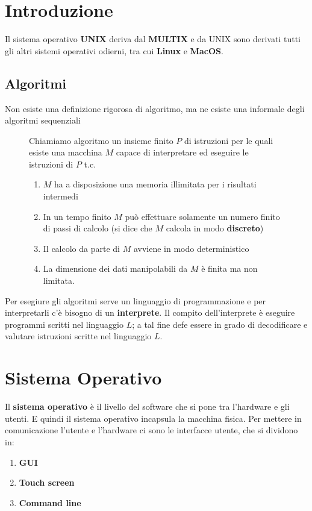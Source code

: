 \documentclass[a4paper]{article}
\theoremstyle{break}
\theoremstyle{break}
\theoremstyle{break}
\theoremstyle{break}
\begin{document}


\tableofcontents
\pagebreak

\section{Introduzione}
Il sistema operativo \textbf{UNIX} deriva dal \textbf{MULTIX} e da UNIX sono
derivati tutti gli altri sistemi operativi odierni, tra cui \textbf{Linux} e
\textbf{MacOS}.

\subsection{Algoritmi}
Non esiste una definizione rigorosa di algoritmo, ma ne esiste una informale degli
algoritmi sequenziali
\begin{figure}[H]
  \begin{definition}
    Chiamiamo algoritmo un insieme finito \( P \) di istruzioni per le quali esiste
    una macchina \( M \) capace di interpretare ed eseguire le istruzioni di \( P \) t.c.
    \begin{enumerate}
      \item \( M \) ha a disposizione una memoria illimitata per i risultati intermedi

      \item In un tempo finito \( M \) può effettuare solamente un numero finito di
        passi di calcolo (si dice che \( M \) calcola in modo \textbf{discreto})
        
      \item Il calcolo da parte di \( M \) avviene in modo deterministico
        
      \item La dimensione dei dati manipolabili da \( M \) è finita ma non limitata.
    \end{enumerate}
  \end{definition}
\end{figure}

\noindent
Per esegiure gli algoritmi serve un linguaggio di programmazione e per interpretarli
c'è bisogno di un \textbf{interprete}. Il compito dell'interprete è eseguire programmi
scritti nel linguaggio \( L \); a tal fine defe essere in grado di decodificare
e valutare istruzioni scritte nel linguaggio \( L \).

\section{Sistema Operativo}
Il \textbf{sistema operativo} è il livello del software che si pone tra l'hardware
e gli utenti. E quindi il sistema operativo incapsula la macchina fisica.
Per mettere in comunicazione l'utente e l'hardware ci sono le interfacce utente,
che si dividono in:
\begin{enumerate}
  \item \textbf{GUI}
  \item \textbf{Touch screen}
  \item \textbf{Command line}
\end{enumerate}
\end{document}
